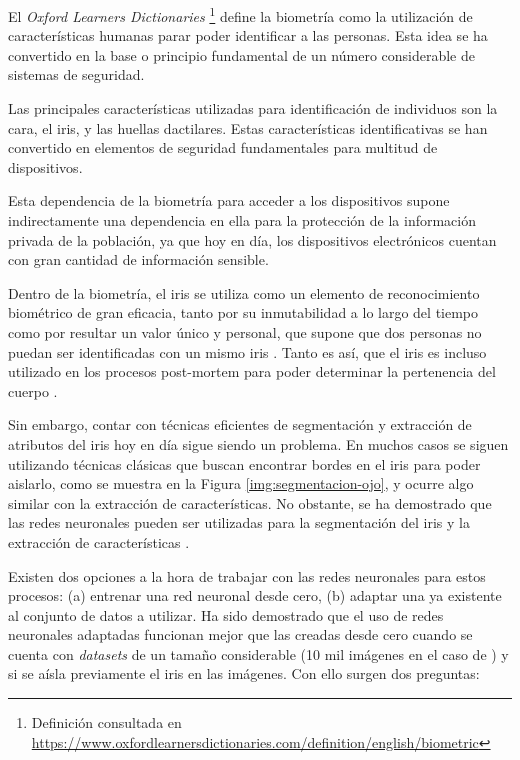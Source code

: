  \label{capitulo1}

El \textit{Oxford Learners Dictionaries} \footnote{Definición consultada en \url{https://www.oxfordlearnersdictionaries.com/definition/english/biometric}} define la biometría como la utilización de características humanas parar poder identificar a las personas. Esta idea se ha convertido en la base o principio fundamental de un número considerable de sistemas de seguridad.

Las principales características utilizadas para identificación de individuos son la cara, el iris, y las huellas dactilares. Estas características identificativas se han convertido en elementos de seguridad fundamentales para multitud de dispositivos. 

Esta dependencia de la biometría para acceder a los dispositivos supone indirectamente una dependencia en ella para la protección de la información privada de la población, ya que hoy en día, los dispositivos electrónicos cuentan con gran cantidad de información sensible.

Dentro de la biometría, el iris se utiliza como un elemento de reconocimiento biométrico de gran eficacia, tanto por su inmutabilidad a lo largo del tiempo como por resultar un valor único y 
personal, que supone que dos personas no puedan ser identificadas con un mismo iris \cite{malgheet_iris_2021}. Tanto es así, que el iris es incluso utilizado en los procesos 
post-mortem para poder determinar la pertenencia del cuerpo \cite{dd_post-mortem_2020}.

Sin embargo, contar con técnicas eficientes de segmentación y extracción de atributos del iris hoy en día sigue siendo un problema. En muchos casos se siguen utilizando técnicas clásicas que buscan encontrar bordes en el iris para poder aislarlo, como se muestra en la Figura \ref{img:segmentacion-ojo}, y ocurre algo similar con la extracción de características.
No obstante, se ha demostrado que las redes neuronales pueden ser utilizadas para la segmentación del iris \cite{lozej_end--end_2018} y la extracción de características \cite{tfg_iris_2020}\cite{boyd_deep_2020}.

Existen dos opciones a la hora de trabajar con las redes neuronales para estos procesos: (a) entrenar una red neuronal desde cero, (b) adaptar una ya existente al conjunto de datos a utilizar. Ha sido demostrado que el uso de redes neuronales adaptadas funcionan mejor que las creadas desde cero cuando se cuenta con \textit{datasets} de un tamaño considerable (10 mil imágenes en el caso de \cite{boyd_deep_2020}) y si se aísla previamente el iris en las imágenes.
Con ello surgen dos preguntas:

